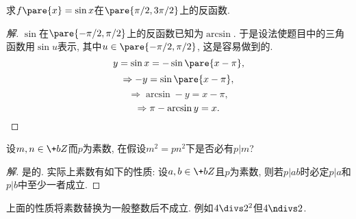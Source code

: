 \documentclass{ctexart}
\begin{document}
\begin{ex}
    求$f\pare{x} = \sin x$在$\pare{\pi/2,3\pi/2}$上的反函数.
\end{ex}
\begin{proof}[解]
    $\sin$在$\pare{-\pi/2,\pi/2}$上的反函数已知为$\arcsin$. 于是设法使题目中的三角函数用$\sin u$表示, 其中$u\in\pare{-\pi/2,\pi/2}$, 这是容易做到的.
    \[ y = \sin x = -\sin \pare{x-\pi}, \]
    \[ \Rightarrow -y = \sin \pare{x-\pi}, \]
    \[ \Rightarrow \arcsin -y = x - \pi, \]
    \[ \Rightarrow \pi - \arcsin y = x. \qedhere \]
\end{proof}
\begin{ex}
    设$m,n\in \+bZ$而$p$为素数, 在假设$m^2 = pn^2$下是否必有$p\vert m$?
\end{ex}
\begin{proof}[解]
    是的. 实际上素数有如下的性质: 设$a,b\in \+bZ$且$p$为素数, 则若$p\vert ab$时必定$p\vert a$和$p\vert b$中至少一者成立.
\end{proof}
\begin{pitfall}
    上面的性质将素数替换为一般整数后不成立. 例如$4\divs 2^2$但$4\ndivs 2$.
\end{pitfall}
\end{document}
